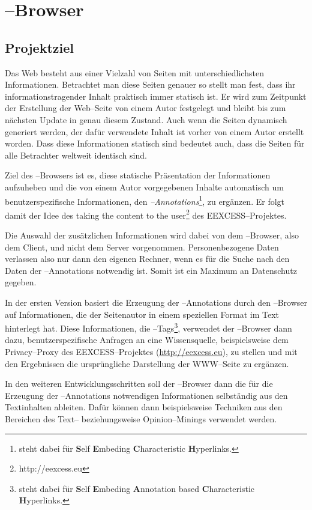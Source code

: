 \chapter{\SECH--Browser}

\section{Projektziel}
Das Web besteht aus einer Vielzahl von Seiten mit unterschiedlichsten
Informationen. Betrachtet man diese Seiten genauer so stellt man fest,
dass ihr informationstragender Inhalt praktisch immer statisch ist.
Er wird zum Zeitpunkt der Erstellung der Web--Seite von einem Autor
festgelegt und bleibt bis zum nächsten Update in genau diesem
Zustand. Auch wenn die Seiten dynamisch generiert werden, der dafür
verwendete Inhalt ist vorher von einem Autor erstellt worden. Dass
diese Informationen statisch sind bedeutet auch, dass die Seiten für
alle Betrachter weltweit identisch sind.

Ziel des \SECH--Browsers ist es, diese statische Präsentation der
Informationen aufzuheben und die von einem Autor vorgegebenen Inhalte
automatisch um benutzerspezifische Informationen, den
\emph{\SECH--Annotations}\footnote{\SECH steht dabei für \textbf{S}elf
  \textbf{E}mbeding \textbf{C}haracteristic \textbf{H}yperlinks.}, zu
ergänzen. Er folgt damit der Idee des \glqq taking the content to the
user\grqq\footnote{http://eexcess.eu} des EEXCESS--Projektes.

Die Auswahl der zusätzlichen Informationen wird dabei von dem
\SECH--Browser, also dem Client, und nicht dem Server
vorgenommen. Personenbezogene Daten verlassen also nur dann den
eigenen Rechner, wenn es für die Suche nach den Daten der
\SECH--Annotations notwendig ist. Somit ist ein Maximum an
Datenschutz gegeben.

In der ersten Version basiert die Erzeugung der \SECH--Annotations
durch den \SECH--Browser auf Informationen, die der Seitenautor in
einem speziellen Format im Text hinterlegt hat. Diese Informationen,
die \SEARCH--Tags\footnote{\SEARCH steht dabei für \textbf{S}elf
  \textbf{E}mbeding \textbf{A}nnotation based \textbf{C}haracteristic \textbf{H}yperlinks.}, verwendet der \SECH--Browser dann dazu, benutzerspezifische
Anfragen an eine Wissensquelle, beispielsweise dem Privacy--Proxy des
EEXCESS--Projektes (\url{http://eexcess.eu}), zu stellen und mit den
Ergebnissen die ursprüngliche Darstellung der WWW--Seite zu
ergänzen. 

In den weiteren Entwicklungsschritten soll der \SECH--Browser dann die
für die Erzeugung der \SECH--Annotations notwendigen Informationen
selbständig aus den Textinhalten ableiten. Dafür können dann
beispielsweise Techniken aus den Bereichen des Text-- beziehungsweise
Opinion--Minings verwendet werden.

